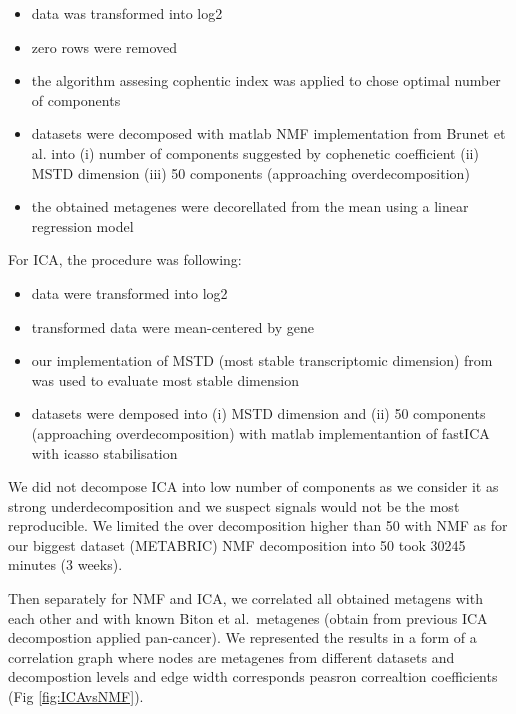 \documentclass[12pt,]{book}
\providecommand{\tightlist}{%
  \setlength{\itemsep}{0pt}\setlength{\parskip}{0pt}}
\theoremstyle{definition}
\theoremstyle{definition}
\theoremstyle{definition}
\theoremstyle{remark}
\begin{document}
\begin{itemize}
\tightlist
\item
  data was transformed into log2
\item
  zero rows were removed
\item
  the algorithm assesing cophentic index was applied to chose optimal
  number of components
\item
  datasets were decomposed with matlab NMF implementation from Brunet et
  al. \citep{Brunet} into (i) number of components suggested by
  cophenetic coefficient (ii) MSTD dimension (iii) 50 components
  (approaching overdecomposition)
\item
  the obtained metagenes were decorellated from the mean using a linear
  regression model
\end{itemize}

For ICA, the procedure was following:

\begin{itemize}
\tightlist
\item
  data were transformed into log2
\item
  transformed data were mean-centered by gene
\item
  our implementation of MSTD (most stable transcriptomic dimension) from
  \citep{Ulykbek2017} was used to evaluate most stable dimension
\item
  datasets were demposed into (i) MSTD dimension and (ii) 50 components
  (approaching overdecomposition) with matlab implementantion of fastICA
  with icasso stabilisation
\end{itemize}

We did not decompose ICA into low number of components as we consider it
as strong underdecomposition and we suspect signals would not be the
most reproducible. We limited the over decomposition higher than 50 with
NMF as for our biggest dataset (METABRIC) NMF decomposition into 50 took
30245 minutes (3 weeks).

Then separately for NMF and ICA, we correlated all obtained metagens
with each other and with known Biton et al.~metagenes (obtain from
previous ICA decompostion applied pan-cancer). We represented the
results in a form of a correlation graph where nodes are metagenes from
different datasets and decompostion levels and edge width corresponds
peasron correaltion coefficients (Fig \ref{fig:ICAvsNMF}).
\end{document}
